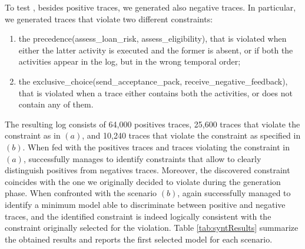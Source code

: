 To test \nd, besides positive traces, we generated also negative traces. In particular, we generated traces that violate two different constraints:
\begin{enumerate}[label=(\textit{\alph*})]
\item the \textsf{precedence(assess\_loan\_risk, assess\_eligibility)}, that is violated when either the latter activity is executed and the former is absent, or if both the activities appear in the log, but in the wrong temporal order;
%
\item the \textsf{exclusive\_choice(send\_acceptance\_pack, receive\_negative\_feedback)}, that is violated when a trace either contains both the activities, or does not contain any of them.
\end{enumerate}
%
The resulting log consists of 64,000 positives traces, 25,600 traces that violate the constraint as in $(a)$, and 10,240 traces that violate the constraint as specified in $(b)$.
%
When fed with the positives traces and traces violating the constraint in $(a)$, \nd successfully manages to identify constraints that allow to clearly distinguish positives from negatives traces. Moreover, the discovered constraint coincides with the one we originally decided to violate during the generation phase. When confronted with the scenario $(b)$, \nd again successfully managed to identify a minimum model able to discriminate between positive and negative traces, and the identified constraint is indeed logically consistent with the constraint originally selected for the violation.
Table \ref{tab:syntResults} summarize the obtained results and reports the first selected model for each scenario.

